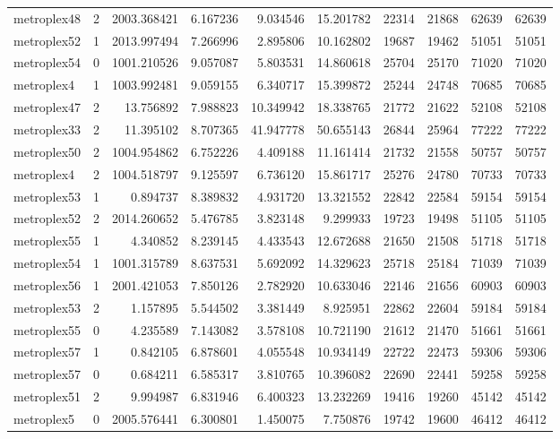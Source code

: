 \begin{longtable}{|l|r|r|r|r|r|r|r|r|r|}
metroplex48 & 2 & 2003.368421 & 6.167236 & 9.034546 & 15.201782 & 22314 & 21868 & 62639 & 62639 \\
metroplex52 & 1 & 2013.997494 & 7.266996 & 2.895806 & 10.162802 & 19687 & 19462 & 51051 & 51051 \\
metroplex54 & 0 & 1001.210526 & 9.057087 & 5.803531 & 14.860618 & 25704 & 25170 & 71020 & 71020 \\
metroplex4 & 1 & 1003.992481 & 9.059155 & 6.340717 & 15.399872 & 25244 & 24748 & 70685 & 70685 \\
metroplex47 & 2 & 13.756892 & 7.988823 & 10.349942 & 18.338765 & 21772 & 21622 & 52108 & 52108 \\
metroplex33 & 2 & 11.395102 & 8.707365 & 41.947778 & 50.655143 & 26844 & 25964 & 77222 & 77222 \\
metroplex50 & 2 & 1004.954862 & 6.752226 & 4.409188 & 11.161414 & 21732 & 21558 & 50757 & 50757 \\
metroplex4 & 2 & 1004.518797 & 9.125597 & 6.736120 & 15.861717 & 25276 & 24780 & 70733 & 70733 \\
metroplex53 & 1 & 0.894737 & 8.389832 & 4.931720 & 13.321552 & 22842 & 22584 & 59154 & 59154 \\
metroplex52 & 2 & 2014.260652 & 5.476785 & 3.823148 & 9.299933 & 19723 & 19498 & 51105 & 51105 \\
metroplex55 & 1 & 4.340852 & 8.239145 & 4.433543 & 12.672688 & 21650 & 21508 & 51718 & 51718 \\
metroplex54 & 1 & 1001.315789 & 8.637531 & 5.692092 & 14.329623 & 25718 & 25184 & 71039 & 71039 \\
metroplex56 & 1 & 2001.421053 & 7.850126 & 2.782920 & 10.633046 & 22146 & 21656 & 60903 & 60903 \\
metroplex53 & 2 & 1.157895 & 5.544502 & 3.381449 & 8.925951 & 22862 & 22604 & 59184 & 59184 \\
metroplex55 & 0 & 4.235589 & 7.143082 & 3.578108 & 10.721190 & 21612 & 21470 & 51661 & 51661 \\
metroplex57 & 1 & 0.842105 & 6.878601 & 4.055548 & 10.934149 & 22722 & 22473 & 59306 & 59306 \\
metroplex57 & 0 & 0.684211 & 6.585317 & 3.810765 & 10.396082 & 22690 & 22441 & 59258 & 59258 \\
metroplex51 & 2 & 9.994987 & 6.831946 & 6.400323 & 13.232269 & 19416 & 19260 & 45142 & 45142 \\
metroplex5 & 0 & 2005.576441 & 6.300801 & 1.450075 & 7.750876 & 19742 & 19600 & 46412 & 46412 \\

\end{longtable}
